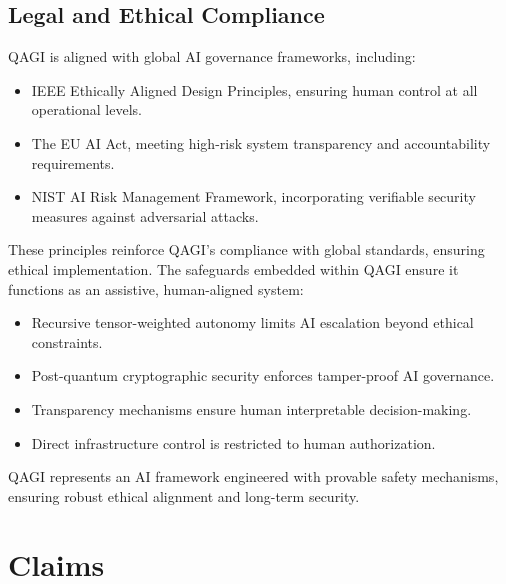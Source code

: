 \documentclass{article}
\theoremstyle{plain}
\theoremstyle{claimstyle}
\begin{document}
\subsection{Legal and Ethical Compliance}
QAGI is aligned with global AI governance frameworks, including:
\begin{itemize}
    \item IEEE Ethically Aligned Design Principles, ensuring human control at all operational levels.
    \item The EU AI Act, meeting high-risk system transparency and accountability requirements.
    \item NIST AI Risk Management Framework, incorporating verifiable security measures against adversarial attacks.
\end{itemize}

These principles reinforce QAGI’s compliance with global standards, ensuring ethical implementation. The safeguards embedded within QAGI ensure it functions as an assistive, human-aligned system:
\begin{itemize}
    \item Recursive tensor-weighted autonomy limits AI escalation beyond ethical constraints.
    \item Post-quantum cryptographic security enforces tamper-proof AI governance.
    \item Transparency mechanisms ensure human interpretable decision-making.
    \item Direct infrastructure control is restricted to human authorization.
\end{itemize}
QAGI represents an AI framework engineered with provable safety mechanisms, ensuring robust ethical alignment and long-term security.

\section*{Claims}
\end{document}
